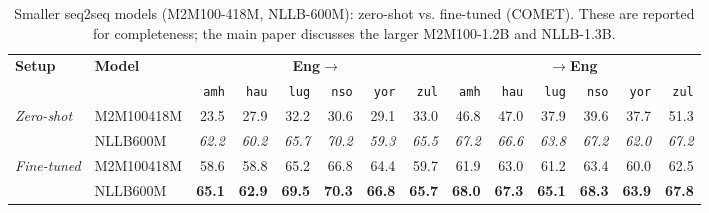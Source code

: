 \begin{table}[t]
\centering
\small
\renewcommand{\arraystretch}{1.05}
\begin{tabular}{llrrrrrrrrrrrr}
\toprule
\textbf{Setup} & \textbf{Model} & \multicolumn{6}{c}{\textbf{Eng$\to$}} & \multicolumn{6}{c}{\textbf{$\to$Eng}} \\
\cmidrule(lr){3-8}\cmidrule(lr){9-14}
  &   & \texttt{amh} & \texttt{hau} & \texttt{lug} & \texttt{nso} & \texttt{yor} & \texttt{zul} & \texttt{amh} & \texttt{hau} & \texttt{lug} & \texttt{nso} & \texttt{yor} & \texttt{zul} \\
\midrule
\multirow{2}{*}{\textit{Zero-shot}} & M2M100\textunderscore{}418M & 23.5 & 27.9 & 32.2 & 30.6 & 29.1 & 33.0 & 46.8 & 47.0 & 37.9 & 39.6 & 37.7 & 51.3 \\
 & NLLB\textunderscore{}600M & \emph{62.2} & \emph{60.2} & \emph{65.7} & \emph{70.2} & \emph{59.3} & \emph{65.5} & \emph{67.2} & \emph{66.6} & \emph{63.8} & \emph{67.2} & \emph{62.0} & \emph{67.2} \\
\midrule
\multirow{2}{*}{\textit{Fine-tuned}} & M2M100\textunderscore{}418M & 58.6 & 58.8 & 65.2 & 66.8 & 64.4 & 59.7 & 61.9 & 63.0 & 61.2 & 63.4 & 60.0 & 62.5 \\
 & NLLB\textunderscore{}600M & \textbf{65.1} & \textbf{62.9} & \textbf{69.5} & \textbf{70.3} & \textbf{66.8} & \textbf{65.7} & \textbf{68.0} & \textbf{67.3} & \textbf{65.1} & \textbf{68.3} & \textbf{63.9} & \textbf{67.8} \\
\bottomrule
\end{tabular}
\caption{Smaller seq2seq models (M2M100-418M, NLLB-600M): zero-shot vs. fine-tuned (COMET). These are reported for completeness; the main paper discusses the larger M2M100-1.2B and NLLB-1.3B.}
\label{tab:seq2seq_smaller_comet}
\end{table}

